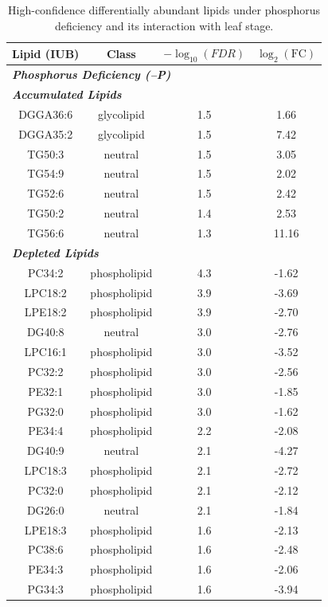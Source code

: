 \documentclass[9pt,twocolumn,twoside]{rilabRxiv}
\begin{document}
\begin{table}[h!]
\centering
\footnotesize
\caption{High-confidence differentially abundant lipids under phosphorus deficiency and its interaction with leaf stage.}
\label{table::phosphorus_lipids}
\begin{tabular}{cccc}
\hline
\textbf{Lipid (IUB)} & \textbf{Class} & \textbf{$-\log_{10}(\textit{FDR})$} & \textbf{$\log_2(\text{FC})$}\\
\hline
\multicolumn{4}{l}{\textit{\textbf{Phosphorus Deficiency (–P)}}} \\
\hline
\multicolumn{4}{l}{\textit{\textbf{Accumulated Lipids}}} \\
\hline
DGGA36:6 & glycolipid & 1.5 & 1.66\\
DGGA35:2 & glycolipid & 1.5 & 7.42\\
TG50:3 & neutral & 1.5 & 3.05\\
TG54:9 & neutral & 1.5 & 2.02\\
TG52:6 & neutral & 1.5 & 2.42\\
TG50:2 & neutral & 1.4 & 2.53\\
TG56:6 & neutral & 1.3 & 11.16\\
\hline
\multicolumn{4}{l}{\textit{\textbf{Depleted Lipids}}} \\
\hline
PC34:2 & phospholipid & 4.3 & -1.62\\
LPC18:2 & phospholipid & 3.9 & -3.69\\
LPE18:2 & phospholipid & 3.9 & -2.70\\
DG40:8 & neutral & 3.0 & -2.76\\
LPC16:1 & phospholipid & 3.0 & -3.52\\
PC32:2 & phospholipid & 3.0 & -2.56\\
PE32:1 & phospholipid & 3.0 & -1.85\\
PG32:0 & phospholipid & 3.0 & -1.62\\
PE34:4 & phospholipid & 2.2 & -2.08\\
DG40:9 & neutral & 2.1 & -4.27\\
LPC18:3 & phospholipid & 2.1 & -2.72\\
PC32:0 & phospholipid & 2.1 & -2.12\\
DG26:0 & neutral & 2.1 & -1.84\\
LPE18:3 & phospholipid & 1.6 & -2.13\\
PC38:6 & phospholipid & 1.6 & -2.48\\
PE34:3 & phospholipid & 1.6 & -2.06\\
PG34:3 & phospholipid & 1.6 & -3.94\\

\end{tabular}
\end{table}
\end{document}
